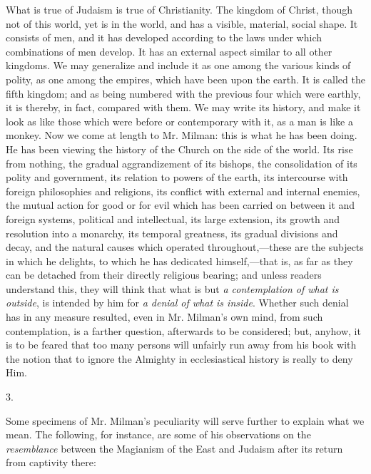 What is true of Judaism is true of Christianity.
The kingdom of Christ, though not of this world, yet is in the world,
and has a visible, material, social shape. It consists of men, and it
has developed according to the laws under which combinations of men
develop. It has an external aspect similar to all other kingdoms. We
may generalize and include it as one among the various kinds of
polity, as one among the empires, which have been upon the earth. It
is called the fifth kingdom; and as being numbered with the previous
four which were earthly, it is thereby, in fact, compared with them.
We may write its history, and make it look as like those which were
before or contemporary with it, as a man is like a monkey. Now we come
at length to Mr. Milman: this is what he has been doing. He has been
viewing the history of the Church on the side of the world. Its rise
from nothing, the gradual aggrandizement of its bishops, the
consolidation of its polity and government, its relation to powers of
the earth, its intercourse with foreign philosophies and religions,
its conflict with external and internal enemies, the mutual action for
good or for evil which has been carried on between it and foreign
systems, political and intellectual, its large extension, its growth
and resolution into a monarchy, its temporal greatness, its gradual
divisions and decay, and the natural causes which operated
throughout,—these are the subjects in which he delights, to which he
has dedicated himself,—that is, as far as they can be detached from
their directly religious bearing; and unless readers understand
this, they will think that what is but \emph{a contemplation of what is
outside}, is intended by him for \emph{a denial of what is inside}.
Whether such denial has in any measure resulted, even in Mr. Milman's
own mind, from such contemplation, is a farther question, afterwards
to be considered; but, anyhow, it is to be feared that too many
persons will unfairly run away from his book with the notion that to
ignore the Almighty in ecclesiastical history is really to deny Him.

3.

Some specimens of Mr. Milman's peculiarity will
serve further to explain what we mean. The following, for instance,
are some of his observations on the \emph{resemblance} between the
Magianism of the East and Judaism after its return from captivity
there:


